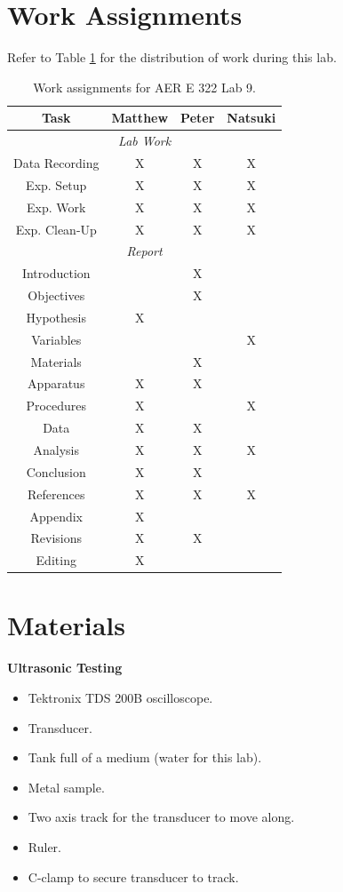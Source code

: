 \documentclass[12 pt]{report}
\begin{document}
\section{Work Assignments} \label{work_assignments}
Refer to Table \ref{tbl:work_assignments} for the distribution of work during this lab.

\begin{table}[!htbp]
\caption{Work assignments for AER E 322 Lab 9.}
\begin{center}
	\begin{tabular}{|c|c|c|c|}
		\hline
		\multicolumn{1}{|c|}{\textbf{Task}}&\textbf{Matthew}&\textbf{Peter}&\textbf{Natsuki}\\
		\hline
		\multicolumn{4}{|c|}{\textit{Lab Work}}\\
		\hline
		Data Recording&X&X&X\\
		\hline
		Exp. Setup&X&X&X\\
		\hline
		Exp. Work&X&X&X\\
		\hline
		Exp. Clean-Up&X&X&X\\
		\hline
		\multicolumn{4}{|c|}{\textit{Report}}\\
		\hline
		Introduction&&X&\\
		\hline
		Objectives&&X&\\
		\hline
		Hypothesis&X&&\\
		\hline
		Variables&&&X\\
		\hline
		Materials&&X&\\
		\hline
		Apparatus&X&X&\\
		\hline
		Procedures&X&&X\\
		\hline
		Data&X&X&\\
		\hline
		Analysis&X&X&X\\
		\hline
		Conclusion&X&X&\\
		\hline
		References&X&X&X\\
		\hline
		Appendix&X&&\\
		\hline
		Revisions&X&X&\\
		\hline
		Editing&X&&\\
		\hline
	\end{tabular}
\end{center}
\label{tbl:work_assignments}
\end{table}

\section{Materials} \label{materials}
\textbf{Ultrasonic Testing}
\begin{itemize}
	\item Tektronix TDS 200B oscilloscope.
	\item Transducer.
	\item Tank full of a medium (water for this lab).
	\item Metal sample.
	\item Two axis track for the transducer to move along.
	\item Ruler.
	\item C-clamp to secure transducer to track.
\end{itemize}
\end{document}
